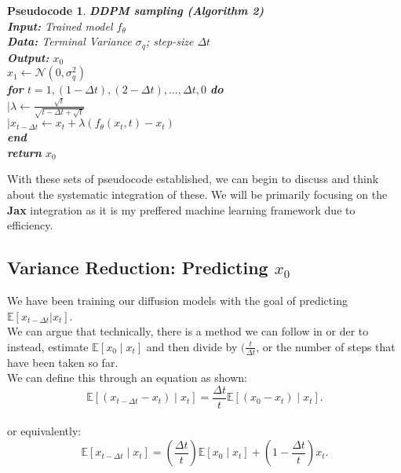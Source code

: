 \documentclass[10pt, oneside]{report}
\newcommand{\E}{\mathbb{E}}
\newtheorem{pse}{Pseudocode}
\begin{document}
\begin{pse}
	\textbf{DDPM sampling (Algorithm 2)}\\
	\textbf{Input:} Trained model $f_\theta$\\
    \textbf{Data:} Terminal Variance $\sigma_q$; step-size $\Delta t$\\
	\textbf{Output:} $x_0$\\
    $x_1 \leftarrow \mathcal{N}(0, \sigma^2_q)$ \\
    \textbf{for} $t=1, (1-\Delta t), (2-\Delta t), \ldots, \Delta t, 0$ \textbf{do}\\
    $\mid \lambda \leftarrow \frac{\sqrt{t}}{\sqrt{t-\Delta t + \sqrt{t}}}$ \\
    $\mid x_{t-\Delta t} \leftarrow x_t + \lambda(f_\theta(x_t, t) -x_t)$ \\
    \textbf{end}\\
	\textbf{return} $x_0$ \\
\end{pse}

With these sets of pseudocode established, we can begin to discuss and think about the systematic integration of these.  We will be primarily focusing on the \textbf{Jax} integration as it is my preffered machine learning framework due to efficiency. \\

\subsection{Variance Reduction: Predicting $x_0$}
We have been training our diffusion models with the goal of predicting $\E[x_{t-\Delta t} | x_t]$.  \\
We can argue that technically, there is a method we can follow in or der to instead, estimate $\E[x_0 \mid x_t]$ and then divide by $(\frac{t}{\Delta t}$, or the number of steps that have been taken so far. \\
We can define this through an equation as shown:
\[
    \E[(x_{t-\Delta t} - x_t) \mid x_t] = \frac{\Delta t}{t} \E[(x_0 - x_t) \mid x_t]
.\] \\
or equivalently:\\
\[
    \E[x_{t - \Delta t} \mid x_t ] = (\frac{\Delta t}{t}) \E[x_0 \mid x_t] + (1 - \frac{\Delta t}{t}) x_t
.\] 
\end{document}

